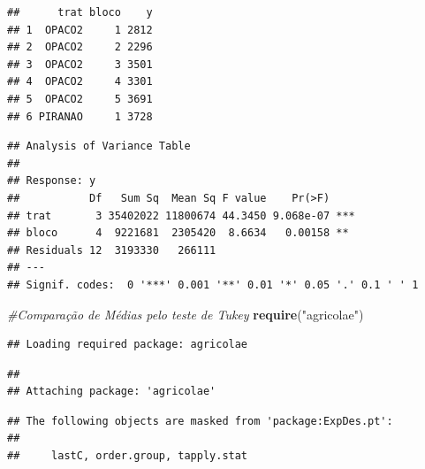 \documentclass[
]{book}
\newenvironment{Shaded}{\begin{snugshade}}{\end{snugshade}}
\newcommand{\CommentTok}[1]{\textcolor[rgb]{0.56,0.35,0.01}{\textit{#1}}}
\newcommand{\KeywordTok}[1]{\textcolor[rgb]{0.13,0.29,0.53}{\textbf{#1}}}
\newcommand{\NormalTok}[1]{#1}
\newcommand{\OperatorTok}[1]{\textcolor[rgb]{0.81,0.36,0.00}{\textbf{#1}}}
\newcommand{\StringTok}[1]{\textcolor[rgb]{0.31,0.60,0.02}{#1}}
\begin{document}
\begin{verbatim}
##      trat bloco    y
## 1  OPACO2     1 2812
## 2  OPACO2     2 2296
## 3  OPACO2     3 3501
## 4  OPACO2     4 3301
## 5  OPACO2     5 3691
## 6 PIRANAO     1 3728
\end{verbatim}

\begin{Shaded}
\end{Shaded}

\begin{verbatim}
## Analysis of Variance Table
## 
## Response: y
##           Df   Sum Sq  Mean Sq F value    Pr(>F)    
## trat       3 35402022 11800674 44.3450 9.068e-07 ***
## bloco      4  9221681  2305420  8.6634   0.00158 ** 
## Residuals 12  3193330   266111                      
## ---
## Signif. codes:  0 '***' 0.001 '**' 0.01 '*' 0.05 '.' 0.1 ' ' 1
\end{verbatim}

\begin{Shaded}
\begin{Highlighting}[]
\CommentTok{#Comparação de Médias pelo teste de Tukey}
\KeywordTok{require}\NormalTok{(}\StringTok{"agricolae"}\NormalTok{)}
\end{Highlighting}
\end{Shaded}

\begin{verbatim}
## Loading required package: agricolae
\end{verbatim}

\begin{verbatim}
## 
## Attaching package: 'agricolae'
\end{verbatim}

\begin{verbatim}
## The following objects are masked from 'package:ExpDes.pt':
## 
##     lastC, order.group, tapply.stat
\end{verbatim}
\end{document}
